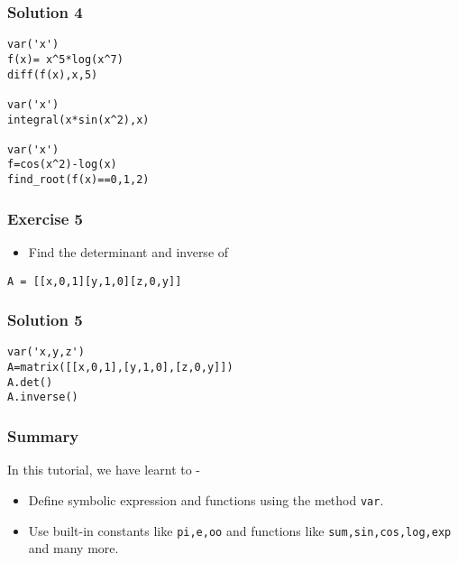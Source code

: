 \documentclass[17pt,compress]{beamer}
\begin{document}
\begin{frame}[fragile]
\frametitle{Solution 4}
\label{sec-11}

\lstset{language=Python}
\begin{footnotesize}
\begin{lstlisting}
var('x')
f(x)= x^5*log(x^7) 
diff(f(x),x,5)

var('x')
integral(x*sin(x^2),x) 

var('x')
f=cos(x^2)-log(x)
find_root(f(x)==0,1,2)
\end{lstlisting}
\end{footnotesize}
\end{frame}
\begin{frame}
\frametitle{Exercise 5}
\label{sec-12}

\begin{itemize}
\item Find the determinant and inverse of 

\end{itemize}
 \hspace{9pt}          \texttt{A = [[x,0,1][y,1,0][z,0,y]]}
\end{frame}
\begin{frame}[fragile]
\frametitle{Solution 5}
\label{sec-13}

\lstset{language=Python}
\begin{small}
\begin{lstlisting}
var('x,y,z')
A=matrix([[x,0,1],[y,1,0],[z,0,y]])
A.det()
A.inverse()
\end{lstlisting}
\end{small}
\end{frame}
\begin{frame}
\frametitle{Summary}
\label{sec-14.1}

In this tutorial, we have learnt to -


\begin{itemize}
\item Define symbolic expression and functions using the method \texttt{var}.
\item Use built-in constants like \texttt{pi,e,oo} and functions like 
   \texttt{sum,sin,cos,log,exp} and many more.
\end{itemize}
\end{frame}
\end{document}
